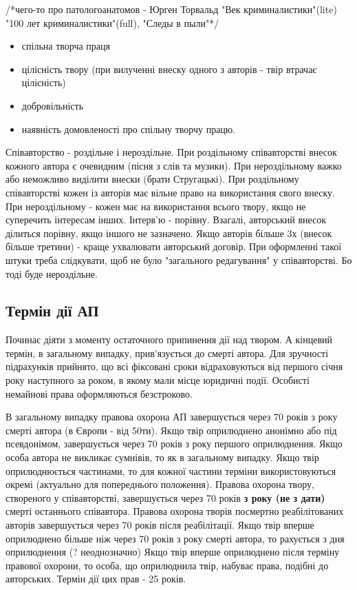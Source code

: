 /*чего-то про патологоанатомов - Юрген Торвальд "Век криминалистики"(lite) "100 лет криминалистики"(full), "Следы в пыли"*/

\begin{itemize}
	\item спільна творча праця
	\item цілісність твору (при вилученні внеску одного з авторів - твір втрачає цілісність)
	\item добровільність
	\item наявність домовленості про спільну творчу працю.
\end{itemize}

Співавторство - роздільне і нероздільне. При роздільному співавторстві внесок кожного автора є очевидним (пісня з слів та музики). При нероздільному важко або неможливо виділити внески (брати Стругацькі). При роздільному співавторстві кожен із авторів має вільне право на використання свого внеску. При нероздільному - кожен має на використання всього твору, якщо не суперечить інтересам інших. Інтерв’ю - порівну. Взагалі, авторський внесок ділиться порівну, якщо іншого не зазначено.
Якщо авторів більше 3х (внесок більше третини) - краще ухвалювати авторський договір.
При оформленні такої штуки треба слідкувати, щоб не було "загального редагування" у співавторстві. Бо тоді буде нероздільне.

\subsection{Термін дії АП}
Починає діяти з моменту остаточного припинення дії над твором. А кінцевий термін, в загальному випадку, прив’язується до смерті автора. Для зручності підрахунків прийнято, що всі фіксовані сроки відраховуються від першого січня року наступного за роком, в якому мали місце юридичні події. Особисті немайнові права оформляються безстроково. 

В загальному випадку правова охорона АП завершується через 70 років з року смерті автора (в Європи - від 50ти). Якщо твір оприлюднено анонімно або під псевдонімом, завершується через 70 років з року першого оприлюднення. Якщо особа автора не викликає сумнівів, то як в загальному випадку. Якщо твір оприлюднюється частинами, то для кожної частини терміни використовуються окремі (актуально для попереднього положення). Правова охорона твору, створеного у співавторстві, завершується через 70 років \textbf{з року (не з дати)} смерті останнього співавтора.
Правова охорона творів посмертно реабілітованих авторів завершується через 70 років після реабілітації.
Якщо твір вперше оприлюднено більше ніж через 70 років з року смерті автора, то рахується з дня оприлюднення (? неоднозначно)
Якщо твір вперше оприлюднено після терміну правової охорони, то особа, що оприлюднила твір, набуває права, подібні до авторських. Термін дії цих прав - 25 років.

